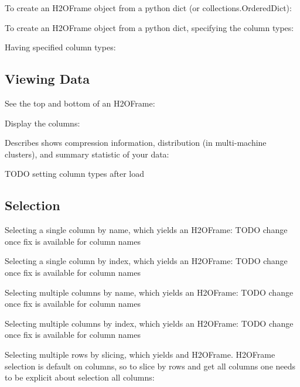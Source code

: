To create an H2OFrame object from a python dict (or collections.OrderedDict):


To create an H2OFrame object from a python dict, specifying the column types:


Having specified column types:


\subsection{Viewing Data}
See the top and bottom of an H2OFrame:


Display the columns:


Describes shows compression information, distribution (in multi-machine clusters), and summary statistic of your data:
\small

\normalsize

TODO setting column types after load


\subsection{Selection}
Selecting a single column by name, which yields an H2OFrame:
TODO change once fix is available for column names


Selecting a single column by index, which yields an H2OFrame:
TODO change once fix is available for column names


Selecting multiple columns by name, which yields an H2OFrame:
TODO change once fix is available for column names


Selecting multiple columns by index, which yields an H2OFrame:
TODO change once fix is available for column names


Selecting multiple rows by slicing, which yields and H2OFrame.
H2OFrame selection is default on columns, so to slice by rows
and get all columns one needs to be explicit about selection all columns:


